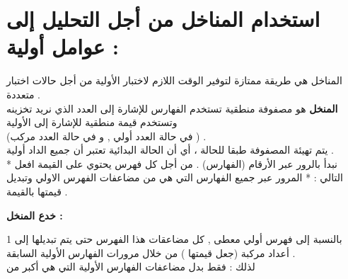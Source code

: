 \documentclass[11pt,a4paper]{report}
\begin{document}
\begin{otherlanguage}{arabic}
\begin{otherlanguage}{arabic}
\begin{center}
\begin{otherlanguage}{arabic}
\begin{center}
\begin{otherlanguage}{arabic}
\begin{center}
\begin{otherlanguage}{arabic}
\begin{center}
\end{center}
\end{otherlanguage}







\end{center}
\end{otherlanguage}



\end{center}
\end{otherlanguage}








\end{center}
\end{otherlanguage}


\chapter{استخدام المناخل من أجل التحليل إلى عوامل أولية :}
\begin{otherlanguage}{arabic}
\begin{center}
المناخل هي طريقة ممتازة لتوفير الوقت اللازم لاختبار الأولية من أجل حالات اختبار متعددة .
\\
\textbf{المنخل }هو مصفوفة منطقية تستخدم الفهارس للإشارة إلى العدد الذي نريد تخزينه وتستخدم قيمة منطقية للإشارة إلى الأولية 
\\
(في حالة   العدد أولي ,   و في حالة  العدد مركب ) .
\\
يتم تهيئة المصفوفة طبقا للحالة   ، أي أن الحالة البدائية تعتبر أن جميع الداد أولية .
\\
*  نبدأ بالرور عبر الأرقام  (الفهارس)  .
من أجل كل فهرس يحتوي على القيمة   افعل التالي :
* المرور عبر جميع الفهارس التي هي من مضاعفات الفهرس الاولي وتبديل قيمتها بالقيمة  .
\\
\begin{flushleft}
\textbf{خدع المنخل :}
\end{flushleft}
1 بالنسبة إلى فهرس أولي معطى , كل مضاعقات هذا الفهرس حتى    
يتم تبديلها إلى أعداد مركبة (جعل قيمتها ) من خلال مرورات الفهارس الأولية السابقة .
\\ 
لذلك : فقط بدل مضاعفات الفهارس الأولية التي هي أكبر من 


\end{center}
\end{otherlanguage}
\end{otherlanguage}
\end{document}
